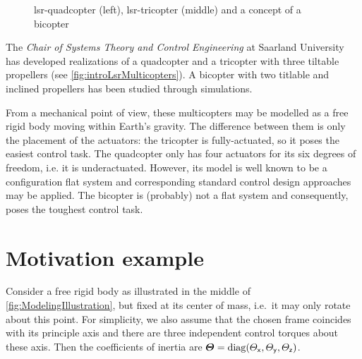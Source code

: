 \begin{figure}[ht]
 \centering
 
 \caption{lsr-quadcopter (left), lsr-tricopter (middle) and a concept of a bicopter}
 \label{fig:introLsrMulticopters}
\end{figure}

The \textit{Chair of Systems Theory and Control Engineering} at Saarland University has developed realizations of a quadcopter and a tricopter with three tiltable propellers (see \autoref{fig:introLsrMulticopters}).
A bicopter with two titlable and inclined propellers has been studied through simulations.

From a mechanical point of view, these multicopters may be modelled as a free rigid body moving within Earth's gravity.
The difference between them is only the placement of the actuators:
the tricopter is fully-actuated, so it poses the easiest control task.
The quadcopter only has four actuators for its six degrees of freedom, i.e. it is underactuated.
However, its model is well known to be a configuration flat system and corresponding standard control design approaches may be applied.
The bicopter is (probably) not a flat system and consequently, poses the toughest control task.


\section{Motivation example}\label{sec:MotivationRigidBodyAttitude}
Consider a free rigid body as illustrated in the middle of \autoref{fig:ModelingIllustration}, but fixed at its center of mass, i.e.\ it may only rotate about this point.
For simplicity, we also assume that the chosen frame coincides with its principle axis and there are three independent control torques about these axis.
Then the coefficients of inertia are $\boldsymbol{\varTheta} = \operatorname{diag}(\varTheta_{\mathsf{x}},\varTheta_{\mathsf{y}},\varTheta_{\mathsf{z}})$.

